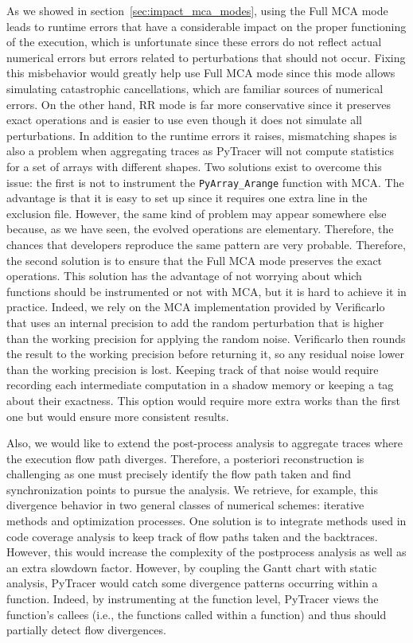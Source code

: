 \documentclass[11pt]{article}
\newcommand{\pytracer}[0]{PyTracer\xspace}
\begin{document}
As we showed in section~\ref{sec:impact_mca_modes}, using the Full MCA mode leads to runtime errors that have a considerable impact on the proper functioning of the execution, which is unfortunate since these errors do not reflect actual numerical errors but errors related to perturbations that should not occur.
Fixing this misbehavior would greatly help use Full MCA mode since this mode allows simulating catastrophic cancellations, which are familiar sources of numerical errors. On the other hand, RR mode is far more conservative since it preserves exact operations and is easier to use even though it does not simulate all perturbations.
In addition to the runtime errors it raises, mismatching shapes is also a problem when aggregating traces as \pytracer will not compute statistics for a set of arrays with different shapes. Two solutions exist to overcome this issue: the first is not to instrument the \texttt{PyArray\_Arange} function with MCA. The advantage is that it is easy to set up since it requires one extra line in the exclusion file. However, the same kind of problem may appear somewhere else because, as we have seen, the evolved operations are elementary. Therefore, the chances that developers reproduce the same pattern are very probable. Therefore, the second solution is to ensure that the Full MCA mode preserves the exact operations. This solution has the advantage of not worrying about which functions should be instrumented or not with MCA, but it is hard to achieve it in practice. Indeed, we rely on the MCA implementation provided by Verificarlo that uses an internal precision to add the random perturbation that is higher than the working precision for applying the random noise. Verificarlo then rounds the result to the working precision before returning it, so any residual noise lower than the working precision is lost. Keeping track of that noise would require recording each intermediate computation in a shadow memory or keeping a tag about their exactness. This option would require more extra works than the first one but would ensure more consistent results.

Also, we would like to extend the post-process analysis to aggregate traces where the execution flow path diverges. Therefore, a posteriori reconstruction is challenging as one must precisely identify the flow path taken and find synchronization points to pursue the analysis. We retrieve, for example, this divergence behavior in two general classes of numerical schemes: iterative methods and optimization processes. One solution is to integrate methods used in code coverage analysis to keep track of flow paths taken and the backtraces. However, this would increase the complexity of the postprocess analysis as well as an extra slowdown factor. However, by coupling the Gantt chart with static analysis, \pytracer would catch some divergence patterns occurring within a function. Indeed, by instrumenting at the function level, \pytracer views the function's callees (i.e., the functions called within a function) and thus should partially detect flow divergences.
\end{document}
